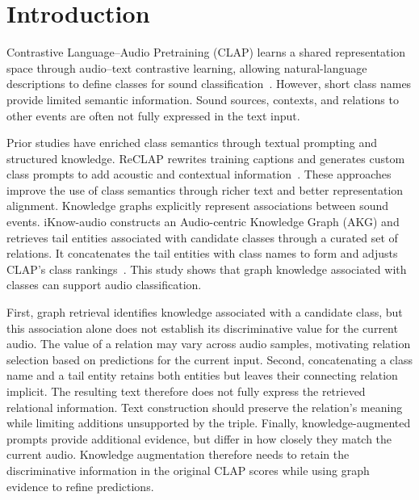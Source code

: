 \section{Introduction}\label{sec:introduction}

 Contrastive Language--Audio Pretraining (CLAP) learns a shared representation space through audio--text contrastive learning, allowing natural-language descriptions to define classes for sound classification~\cite{elizalde2023clap}. However, short class names provide limited semantic information. Sound sources, contexts, and relations to other events are often not fully expressed in the text input.

Prior studies have enriched class semantics through textual prompting and structured knowledge. ReCLAP rewrites training captions and generates custom class prompts to add acoustic and contextual information~\cite{ghosh2024reclap}.  These approaches improve the use of class semantics through richer text and better representation alignment. Knowledge graphs explicitly represent associations between sound events. iKnow-audio constructs an Audio-centric Knowledge Graph (AKG) and retrieves tail entities associated with candidate classes through a curated set of relations. It concatenates the tail entities with class names to form  and adjusts CLAP's class rankings~\cite{olvera-etal-2025-iknow}. This study shows that graph knowledge associated with classes can support audio classification. 

 First, graph retrieval identifies knowledge associated with a candidate class, but this association alone does not establish its discriminative value for the current audio. The value of a relation may vary across audio samples, motivating relation selection based on predictions for the current input. Second, concatenating a class name and a tail entity retains both entities but leaves their connecting relation implicit. The resulting text therefore does not fully express the retrieved relational information. Text construction should preserve the relation's meaning while limiting additions unsupported by the triple. Finally, knowledge-augmented prompts provide additional evidence, but differ in how closely they match the current audio.  Knowledge augmentation therefore needs to retain the discriminative information in the original CLAP scores while using graph evidence to refine predictions.

